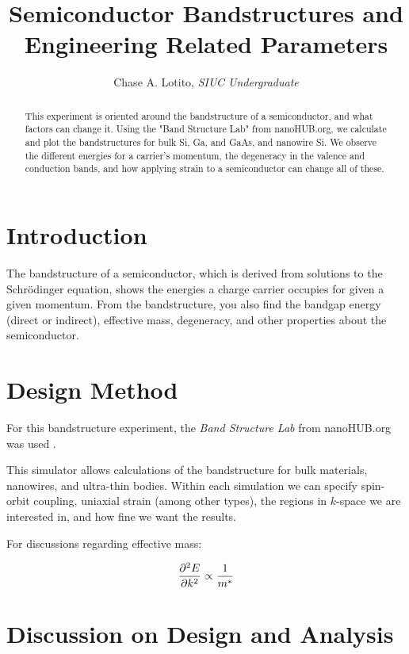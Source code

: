 \documentclass{IEEEtran}
\title{Semiconductor Bandstructures and Engineering Related Parameters}
\author{Chase A. Lotito, \textit{SIUC Undergraduate}}
\date{}
\begin{document}
\maketitle %

\begin{abstract}
    This experiment is oriented around the bandstructure of a semiconductor, and what factors can change it. Using the "Band Structure Lab" from nanoHUB.org, we calculate and plot the bandstructures for bulk Si, Ga, and GaAs, and nanowire Si. We observe the different energies for a carrier's momentum, the degeneracy in the valence and conduction bands, and how applying strain to a semiconductor can change all of these.
\end{abstract}

\section{Introduction}

The bandstructure of a semiconductor, which is derived from solutions to the Schr\"{o}dinger equation, shows the energies a charge carrier occupies for given a given momentum. From the bandstructure, you also find the bandgap energy (direct or indirect), effective mass, degeneracy, and other properties about the semiconductor.

\section{Design Method}
For this bandstructure experiment, the \textit{Band Structure Lab} from nanoHUB.org was used \cite{sim}.

This simulator allows calculations of the bandstructure for bulk materials, nanowires, and ultra-thin bodies. Within each simulation we can specify spin-orbit coupling, uniaxial strain (among other types), the regions in \(k\)-space we are interested in, and how fine we want the results.

For discussions regarding effective mass:

\begin{equation}\label{eq:curvature-effective-mass}
    \pdv[2]{E}{k} \propto \frac{1}{m^*}
\end{equation}

\section{Discussion on Design and Analysis}
\end{document}
